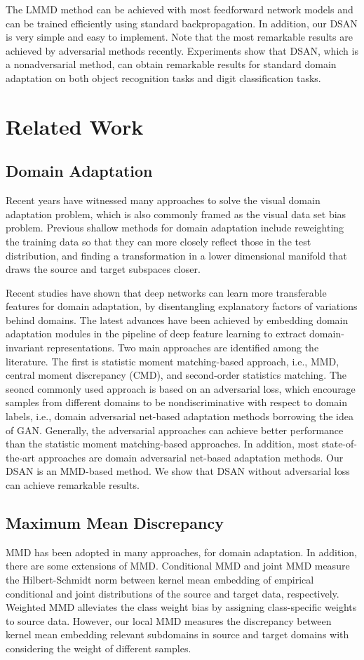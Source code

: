 \documentclass[conference]{IEEEtran}
\begin{document}
The LMMD method can be achieved with most feedforward network models and can be trained efficiently using standard backpropagation.
In addition, our DSAN is very simple and easy to implement. Note that the most remarkable results are achieved by adversarial methods recently. 
Experiments show that DSAN, which is a nonadversarial method, can obtain remarkable results for standard domain adaptation on both object recognition tasks and digit classification tasks.

\section{Related Work}
\subsection{Domain Adaptation} Recent years have witnessed many approaches to solve the visual domain adaptation problem, which is also commonly framed as the visual data set bias problem.
Previous shallow methods for domain adaptation include reweighting the training data so that they can more closely reflect those in the test distribution, and finding a transformation in a lower dimensional manifold that draws the source and target subspaces closer.

Recent studies have shown that deep networks can learn more transferable features for domain adaptation, by disentangling explanatory factors of variations behind domains.
The latest advances have been achieved by embedding domain adaptation modules in the pipeline of deep feature learning to extract domain-invariant representations.
Two main approaches are identified among the literature. The first is statistic moment matching-based approach, i.e., MMD, central moment discrepancy (CMD), and second-order statistics matching.
The seoncd commonly used approach is based on an adversarial loss, which encourage samples from different domains to be nondiscriminative with respect to domain labels, i.e., domain adversarial net-based adaptation methods borrowing the idea of GAN.
Generally, the adversarial approaches can achieve better performance than the statistic moment matching-based approaches. In addition, most state-of-the-art approaches are domain adversarial net-based adaptation methods.
Our DSAN is an MMD-based method. We show that DSAN without adversarial loss can achieve remarkable results.

\subsection{Maximum Mean Discrepancy}
MMD has been adopted in many approaches, for domain adaptation.
In addition, there are some extensions of MMD. Conditional MMD and joint MMD measure the Hilbert-Schmidt norm between kernel mean embedding of empirical conditional and joint distributions of the source and target data, respectively.
Weighted MMD alleviates the class weight bias by assigning class-specific weights to source data.
However, our local MMD measures the discrepancy between kernel mean embedding relevant subdomains in source and target domains with considering the weight of different samples.
\end{document}
